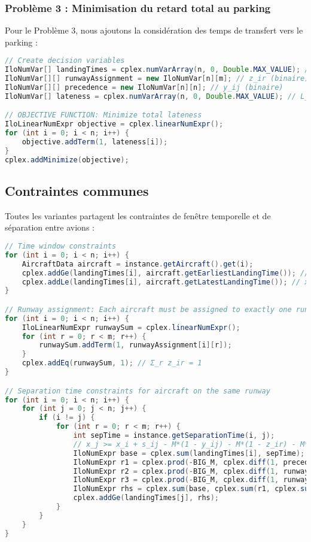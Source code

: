 \documentclass[a4paper,12pt]{report}
\begin{document}
\subsubsection{Problème 3 : Minimisation du retard total au parking}
Pour le Problème 3, nous ajoutons la considération des temps de transfert vers le parking :

\begin{lstlisting}[language=Java, caption=Extrait de Problem3Solver - Fonction objectif]
// Create decision variables
IloNumVar[] landingTimes = cplex.numVarArray(n, 0, Double.MAX_VALUE); // x_i
IloNumVar[][] runwayAssignment = new IloNumVar[n][m]; // z_ir (binaire)
IloNumVar[][] precedence = new IloNumVar[n][n]; // y_ij (binaire)
IloNumVar[] lateness = cplex.numVarArray(n, 0, Double.MAX_VALUE); // L_i

// OBJECTIVE FUNCTION: Minimize total lateness
IloLinearNumExpr objective = cplex.linearNumExpr();
for (int i = 0; i < n; i++) {
    objective.addTerm(1, lateness[i]);
}
cplex.addMinimize(objective);
\end{lstlisting}

\subsection{Contraintes communes}
Toutes les variantes partagent les contraintes de fenêtre temporelle et de séparation entre avions :

\begin{lstlisting}[language=Java, caption=Contraintes communes aux trois problèmes]
// Time window constraints
for (int i = 0; i < n; i++) {
    AircraftData aircraft = instance.getAircraft().get(i);
    cplex.addGe(landingTimes[i], aircraft.getEarliestLandingTime()); // x_i >= E_i
    cplex.addLe(landingTimes[i], aircraft.getLatestLandingTime()); // x_i <= L_i
}

// Runway assignment: Each aircraft must be assigned to exactly one runway
for (int i = 0; i < n; i++) {
    IloLinearNumExpr runwaySum = cplex.linearNumExpr();
    for (int r = 0; r < m; r++) {
        runwaySum.addTerm(1, runwayAssignment[i][r]);
    }
    cplex.addEq(runwaySum, 1); // Σ_r z_ir = 1
}

// Separation time constraints for aircraft on the same runway
for (int i = 0; i < n; i++) {
    for (int j = 0; j < n; j++) {
        if (i != j) {
            for (int r = 0; r < m; r++) {
                int sepTime = instance.getSeparationTime(i, j);
                // x_j >= x_i + s_ij - M*(1 - y_ij) - M*(1 - z_ir) - M*(1 - z_jr)
                IloNumExpr base = cplex.sum(landingTimes[i], sepTime);
                IloNumExpr r1 = cplex.prod(-BIG_M, cplex.diff(1, precedence[i][j]));
                IloNumExpr r2 = cplex.prod(-BIG_M, cplex.diff(1, runwayAssignment[i][r]));
                IloNumExpr r3 = cplex.prod(-BIG_M, cplex.diff(1, runwayAssignment[j][r]));
                IloNumExpr rhs = cplex.sum(base, cplex.sum(r1, cplex.sum(r2, r3)));
                cplex.addGe(landingTimes[j], rhs);
            }
        }
    }
}
\end{lstlisting}
\end{document}
